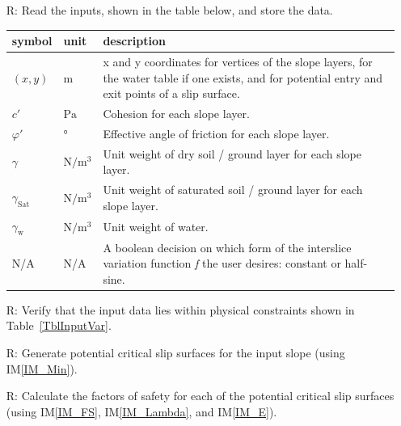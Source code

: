 \documentclass[12pt]{article}
\renewcommand{\arraystretch}{1}
\newcommand{\iref}[1]{IM\ref{#1}}
\newcounter{reqnum} %
\newcounter{tablenum} %
\begin{document}
\noindent \begin{itemize}

\item[R\refstepcounter{reqnum}\thereqnum \label{R_Inputs}:] Read the
  inputs, shown in the table below, and store the data.
  
  \renewcommand{\arraystretch}{1.5}
  \noindent \begin{longtable}{l l p{12cm}} \toprule \textbf{symbol} &
    {tablenum}  \label{Table:Inputs}
    \textbf{unit} & \textbf{description}\\ \midrule
    $\left(x,y\right)$ & $\text{m}$ & x and y coordinates for vertices
    of the slope layers, for the water table if one exists, and for potential 
    entry and exit points of a slip surface.\\
    $c'$ & $\si{\pascal}$ & Cohesion for each slope layer. \\
    $\varphi'$ & \si{\degree} & Effective angle of friction for each
    slope layer. \\
    $\gamma$ & $\si{\newton\per\meter\cubed}$ & Unit weight of dry
    soil / ground layer for each slope layer. \\
    $\gamma_{\text{Sat}}$ & $\si{\newton\per\meter\cubed}$ & Unit
    weight of saturated soil / ground layer for each slope
    layer. \\
    $\gamma_{\text{w}}$ & $\si{\newton\per\meter\cubed}$ & Unit
    weight of water. \\
    N/A & N/A & A boolean decision on which form of the interslice variation 
    function \textit{f} the user desires: constant or half-sine.\\ \bottomrule
\end{longtable}

\item[R\refstepcounter{reqnum}\thereqnum \label{R_KinAdm}:] Verify that the 
input data lies within physical constraints shown in Table~\ref{TblInputVar}.

\item[R\refstepcounter{reqnum}\thereqnum \label{R_InitGen}:] Generate
potential critical slip surfaces for the input slope (using \iref{IM_Min}). 

\item[R\refstepcounter{reqnum}\thereqnum \label{R_FS}:] Calculate the
  factors of safety for each of the potential critical slip surfaces (using 
  \iref{IM_FS}, \iref{IM_Lambda}, and \iref{IM_E}).


\end{itemize}
\end{document}
